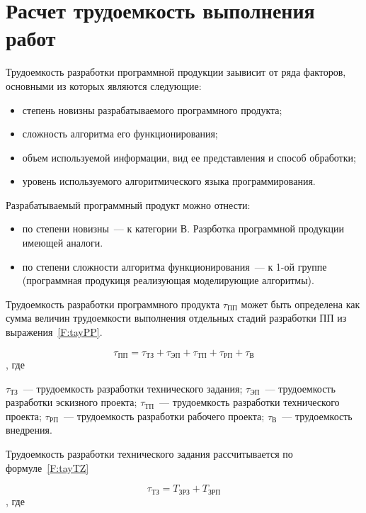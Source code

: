 \section{Расчет трудоемкость выполнения работ}

Трудоемкость разработки программной продукции заывисит от ряда факторов, основными из которых являются следующие:

\begin{itemize}
\item степень новизны разрабатываемого программного продукта;
\item сложность алгоритма его функционирования;
\item объем используемой информации, вид ее представления и способ обработки;
\item уровень используемого алгоритмического языка программирования.
\end{itemize}

Разрабатываемый программный продукт можно отнести:

\begin{itemize}
\item по степени новизны~--- к категории В. Разрботка программной продукции имеющей аналоги. 
\item по степени сложности алгоритма функционирования~--- к 1-ой группе (программная продукиця реализующая моделирующие алгоритмы). 
\end{itemize}

Трудоемкость разработки программного продукта $\tau_{\text{ПП}}$ может быть определена как сумма величин трудоемкости выполнения отдельных стадий разработки ПП из выражения~\ref{F:tayPP}.

\begin{equation}
\tau_{\text{ПП}} = \tau_{\text{ТЗ}} + \tau_{\text{ЭП}} + \tau_{\text{ТП}} + \tau_{\text{РП}} + \tau_{\text{В}}
\label{F:tayPP}
\end{equation}, где

$\tau_{\text{ТЗ}}$~--- трудоемкость разработки технического задания; $\tau_{\text{ЭП}}$~--- трудоемкость разработки эскизного проекта; $\tau_{\text{ТП}}$~--- трудоемкость разработки технического проекта; $\tau_{\text{РП}}$~--- трудоемкость разработки рабочего проекта; $\tau_{\text{В}}$~--- трудоемкость внедрения.

Трудоемкость разработки технического задания рассчитывается по формуле~\ref{F:tayTZ}

\begin{equation}
\tau_{\text{ТЗ}} = T_{\text{ЗРЗ}} + T_{\text{ЗРП}}
\label{F:tayTZ}
\end{equation}, где


